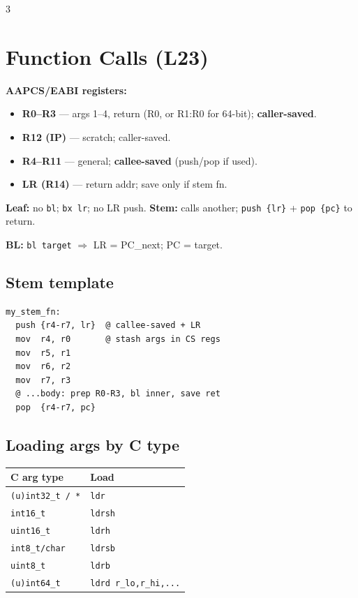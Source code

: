 \documentclass[8pt,landscape]{extarticle}
\newcommand{\asm}[1]{\texttt{\scriptsize #1}}
\newcommand{\cee}[1]{\texttt{\scriptsize #1}}
\begin{document}
\begin{multicols*}{3}
\section{Function Calls (L23)}
\textbf{AAPCS/EABI registers:}
\begin{itemize}
\item \textbf{R0--R3} --- args 1--4, return (R0, or R1:R0 for 64-bit); \textbf{caller-saved}.
\item \textbf{R12 (IP)} --- scratch; caller-saved.
\item \textbf{R4--R11} --- general; \textbf{callee-saved} (push/pop if used).
\item \textbf{LR (R14)} --- return addr; save only if stem fn.
\end{itemize}

\textbf{Leaf:} no \texttt{bl}; \texttt{bx lr}; no LR push.\;
\textbf{Stem:} calls another; \texttt{push \{lr\}} + \texttt{pop \{pc\}} to return.

\textbf{BL:} \asm{bl target} $\Rightarrow$ LR = PC\_next; PC = target.

\subsection{Stem template}
\begin{lstlisting}
my_stem_fn:
  push {r4-r7, lr}  @ callee-saved + LR
  mov  r4, r0       @ stash args in CS regs
  mov  r5, r1
  mov  r6, r2
  mov  r7, r3
  @ ...body: prep R0-R3, bl inner, save ret
  pop  {r4-r7, pc}
\end{lstlisting}

\subsection{Loading args by C type}
\begin{tabular}{@{}ll@{}}
\toprule
C arg type & Load \\
\midrule
\cee{(u)int32\_t / *} & \asm{ldr} \\
\cee{int16\_t}  & \asm{ldrsh} \\
\cee{uint16\_t} & \asm{ldrh}  \\
\cee{int8\_t/char} & \asm{ldrsb} \\
\cee{uint8\_t}  & \asm{ldrb}  \\
\cee{(u)int64\_t} & \asm{ldrd r\_lo,r\_hi,...} \\
\bottomrule
\end{tabular}


\end{multicols*}
\end{document}
